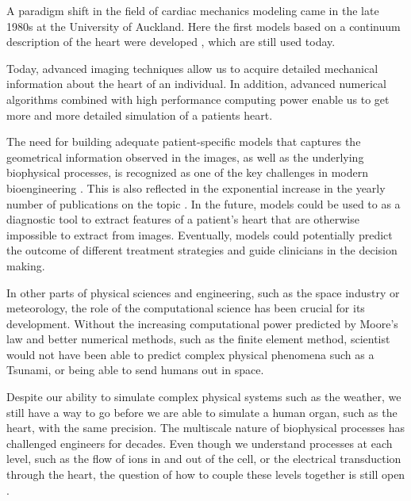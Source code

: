 A paradigm shift in the field of cardiac mechanics modeling came in
the late 1980s at the University of Auckland. Here the first models
based on a continuum description of the heart were developed
\cite{hunter1988analysis}, which are still used today. 





Today, advanced imaging techniques allow us to acquire detailed
mechanical information about the heart of an individual. In addition,
advanced numerical algorithms combined with high performance computing
power enable us to get more and more detailed simulation of a patients
heart. 



The need for building adequate patient-specific models that captures
the geometrical information observed in the images, as well as the
underlying biophysical processes, is recognized as one of the key
challenges in modern bioengineering \cite{hunter2010vision}. This is
also reflected in the exponential increase in the yearly number of
publications on the topic \cite{sack2016personalised}.
In the future, models could be used to as a diagnostic tool to extract
features of a patient's heart that are otherwise impossible to extract from
images. Eventually, models could potentially predict the outcome of
different treatment strategies and guide clinicians in the decision making.

In other parts of physical sciences and engineering, such as the
space industry or meteorology, the role of the computational
science has been crucial for its development. Without the increasing
computational power predicted by Moore's law
\cite{brock2006understanding} and better numerical methods, such as the
finite element method, scientist would not have been able to predict
complex physical phenomena such as a Tsunami, or being able to send
humans out in space. 

Despite our ability to simulate complex physical systems such as
the weather, we still have a way to go before we are able to
simulate a human organ, such as the heart, with the same precision. The
multiscale nature of biophysical processes has challenged engineers for decades.
Even though we understand processes at each level, such as the flow of
ions in and out of the cell, or the electrical transduction through the
heart, the question of how to couple these levels together is still open
\cite{noble2002modeling}.

